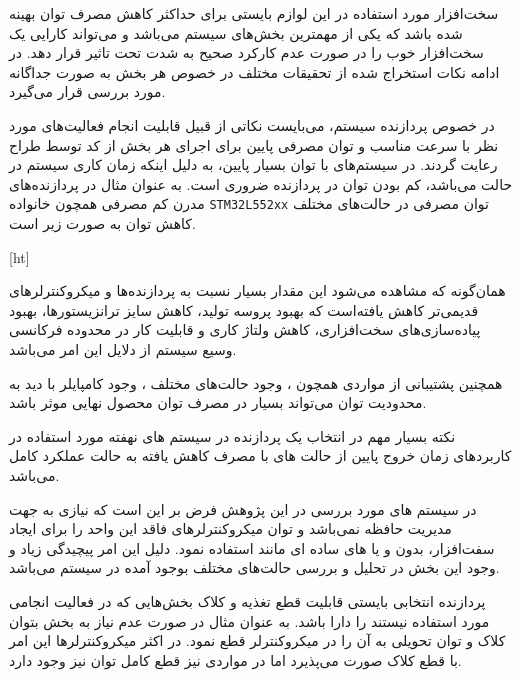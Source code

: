 سخت‌افزار مورد استفاده در این لوازم بایستی برای حداکثر کاهش مصرف توان بهینه شده باشد که یکی از مهمترین بخش‌های سیستم می‌باشد و می‌تواند کارایی یک سخت‌افزار خوب را در صورت عدم کارکرد صحیح به شدت تحت تاثیر قرار دهد. در ادامه نکات استخراج شده از تحقیقات مختلف در خصوص هر بخش به صورت جداگانه مورد بررسی قرار می‌گیرد.


در خصوص پردازنده سیستم، می‌بایست نکاتی از قبیل قابلیت انجام فعالیت‌های مورد نظر با سرعت مناسب و توان مصرفی پایین برای اجرای هر بخش از کد توسط طراح رعایت گردند. در سیستم‌های  با توان بسیار پایین، به دلیل اینکه زمان کاری سیستم در حالت  می‌باشد، کم بودن توان  در پردازنده ضروری است.  به عنوان مثال در پردازنده‌های مدرن کم مصرفی همچون خانواده \texttt{STM32L552xx} توان مصرفی در حالت‌های مختلف کاهش توان به صورت زیر است.


[ht]


همان‌گونه که مشاهده می‌شود این مقدار بسیار نسبت به پردازنده‌ها و میکروکنترلرهای قدیمی‌تر کاهش یافته‌است که بهبود پروسه تولید، کاهش سایز ترانزیستورها، بهبود پیاده‌سازی‌های سخت‌افزاری، کاهش ولتاژ کاری و قابلیت کار در محدوده فرکانسی وسیع سیستم از دلایل این امر می‌باشد. 

همچنین پشتیبانی از مواردی همچون ، وجود حالت‌های مختلف ، وجود کامپایلر با دید به محدودیت توان می‌تواند بسیار در مصرف توان محصول نهایی موثر باشد. 

نکته بسیار مهم در انتخاب یک پردازنده در سیستم های نهفته مورد استفاده در کاربردهای  زمان خروج پایین از حالت های با مصرف کاهش یافته به حالت عملکرد کامل می‌باشد.

در سیستم های مورد بررسی در این پژوهش فرض بر این است که نیازی به  جهت مدیریت حافظه نمی‌باشد و توان میکروکنترلرهای فاقد این واحد را برای ایجاد سفت‌افزار، بدون  و یا های ساده ای مانند  استفاده نمود. دلیل این امر پیچیدگی زیاد و وجود این بخش در تحلیل و بررسی حالت‌های مختلف بوجود آمده در سیستم می‌باشد.

پردازنده انتخابی بایستی قابلیت قطع تغذیه و کلاک بخش‌هایی که در فعالیت انجامی مورد استفاده نیستند را دارا باشد. به عنوان مثال در صورت عدم نیاز به بخش  بتوان کلاک و توان تحویلی به آن را در میکروکنترلر قطع نمود. در اکثر میکروکنترلرها این امر با قطع کلاک صورت می‌پذیرد اما در مواردی نیز قطع کامل توان نیز وجود دارد.


